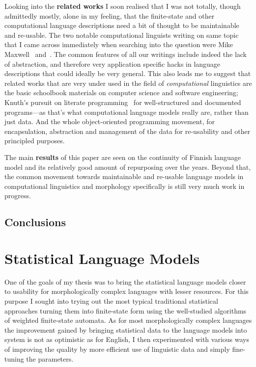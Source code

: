 \documentclass[officiallayout,draft]{unihelcompling}
\begin{document}
Looking into the \textbf{related works} I soon realised that I was not totally,
though admittedly mostly, alone in my feeling, that the finite-state and other
computational language descriptions need a bit of thought to be maintainable
and re-usable. The two notable computational linguists writing on same topic
that I came across immediately when searching into the question were Mike
Maxwell~\cite{maxwell2008joint} and~\cite{wintner2008strengths}. The common
features of all our writings include indeed the lack of abstraction, and
therefore very application specific hacks in language descriptions that could
ideally be very general. This also leads me to suggest that related works that
are very under used in the field of \emph{computational} linguistics are the
basic schoolbook materials on computer science and software engineering;
Knuth's pursuit on literate programming~\cite{knuth1984literate} for
well-structured and documented programs---as that's what computational language
models really are, rather than just data. And the whole object-oriented
programming movement, for encapsulation, abstraction and management of the data
for re-usability and other principled purposes.

The main \textbf{results} of this paper are seen on the continuity of Finnish
language model and its relatively good amount of repurposing over the years.
Beyond that, the common movement towards maintainable and re-usable language
models in computational linguistics and morphology specifically is still very
much work in progress.

\section{Conclusions}



\chapter{Statistical Language Models}
\label{chap:statistical-models}

One of the goals of my thesis was to bring the statistical language models
closer to usability for morphologically complex languages with lesser
resources. For this purpose I sought into trying out the most typical
traditional statistical approaches turning them into finite-state form
using the well-studied algorithms of weighted finite-state automata. As for
most morphologically complex languages the improvement gained by bringing
statistical data to the language models into system is not as optimistic as
for English, I then experimented with various ways of improving the quality
by more efficient use of linguistic data and simply fine-tuning the parameters.
\end{document}
